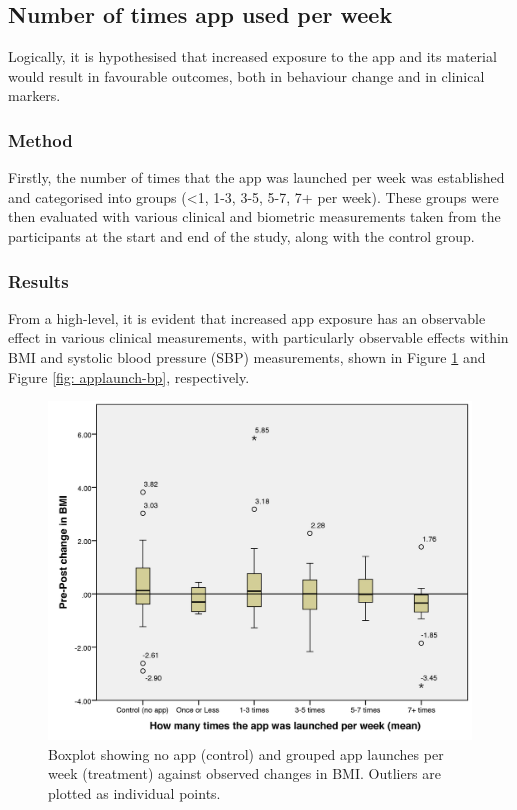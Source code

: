 \subsection{Number of times app used per week}
Logically, it is hypothesised that increased exposure to the app and its material would result in favourable outcomes, both in behaviour change and in clinical markers.
\subsubsection{Method}
Firstly, the number of times that the app was launched per week was established and categorised into groups (\textless1, 1-3, 3-5, 5-7, 7+ per week). These groups were then evaluated with various clinical and biometric measurements taken from the participants at the start and end of the study, along with the control group.
\subsubsection{Results}
From a high-level, it is evident that increased app exposure has an observable effect in various clinical measurements, with particularly observable effects within BMI and systolic blood pressure (SBP) measurements, shown in Figure \ref{fig: applaunch-bmi} and Figure \ref{fig: applaunch-bp}, respectively.

\begin{figure}[h]
	\centering
    \includegraphics[scale=0.18, angle=0]{Files/prevention-study-3/figures/applaunch-bmi}
  	\caption{Boxplot showing no app (control) and grouped app launches per week (treatment) against observed changes in BMI. Outliers are plotted as individual points.}
    \label{fig: applaunch-bmi}
\end{figure}

